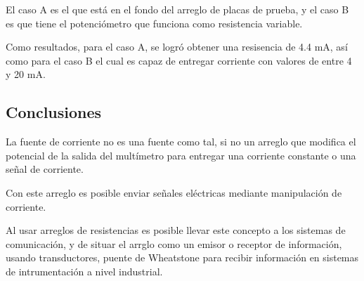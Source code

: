 El caso A es el que está en el fondo del arreglo de placas de prueba, y el caso B es que tiene el potenciómetro que funciona
como resistencia variable.

Como resultados, para el caso A, se logró obtener una resisencia de 4.4 mA, así como para el caso B el cual es capaz de entregar
corriente con valores de entre 4 y 20 mA.


\subsection{Conclusiones}
La fuente de corriente no es una fuente como tal, si no un arreglo que modifica el potencial de la salida del multímetro
para entregar una corriente constante o una señal de corriente.

Con este arreglo es posible enviar señales eléctricas mediante manipulación de corriente.

Al usar arreglos de resistencias es posible llevar este concepto a los sistemas de comunicación, y de situar el arrglo como
un emisor o receptor de información, usando transductores, puente de Wheatstone para recibir información en sistemas de
intrumentación a nivel industrial.

